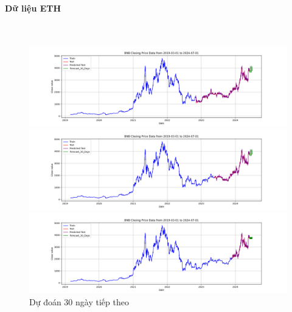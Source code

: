 \documentclass[conference]{IEEEtran}
\begin{document}
\paragraph{\textbf{Dữ liệu ETH}} \mbox{} \\
\begin{figure}[H]
    \centering
    \begin{minipage}{0.15\textwidth}
    \centering
    \includegraphics[width=1\textwidth]{Figure/RandomForest_ETH_30days_73.png}
    \end{minipage}
    \hfill
    \begin{minipage}{0.15\textwidth}
    \centering
    \includegraphics[width=1\textwidth]{Figure/RandomForest_ETH_30days_82.png}
    \end{minipage}
    \hfill
    \begin{minipage}{0.15\textwidth}
    \centering
    \includegraphics[width=1\textwidth]{Figure/RandomForest_ETH_30days_91.png}
    \end{minipage}
    \caption{Dự đoán 30 ngày tiếp theo}
    \label{fig:1}
\end{figure}
\end{document}
